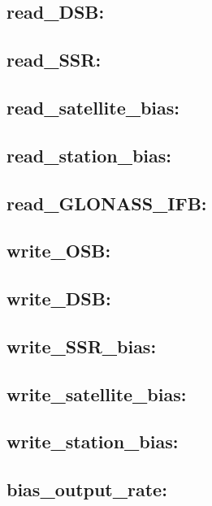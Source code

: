 \subsection{read\_DSB:}

\subsection{read\_SSR:}

\subsection{read\_satellite\_bias:}

\subsection{read\_station\_bias:}

\subsection{read\_GLONASS\_IFB:}

\subsection{write\_OSB:}

\subsection{write\_DSB:}

\subsection{write\_SSR\_bias:}

\subsection{write\_satellite\_bias:}

\subsection{write\_station\_bias:}

\subsection{bias\_output\_rate:}






